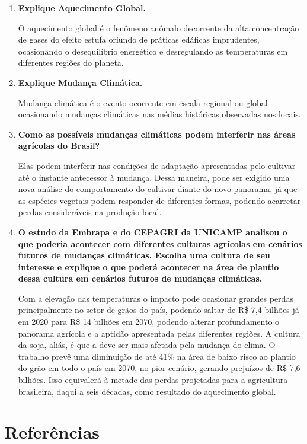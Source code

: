 \documentclass[a4paper, 12pt]{article}
\begin{document}
\begin{enumerate}
		\item\textbf{Explique Aquecimento Global.}
		
		O aquecimento global é o fenômeno anômalo decorrente da alta concentração de gases do efeito estufa oriundo de práticas edáficas imprudentes, ocasionando o desequilíbrio energético e desregulando as temperaturas em diferentes regiões do planeta.
		
		\item\textbf{Explique Mudança Climática.}
		
		Mudança climática é o evento ocorrente em escala regional ou global ocasionando mudanças climáticas nas médias históricas observadas nos locais.
		
		\item\textbf{Como as possíveis mudanças climáticas podem interferir nas áreas agrícolas do Brasil?}
		
		Elas podem interferir nas condições de adaptação apresentadas pelo cultivar até o instante antecessor à mudança. Dessa maneira, pode ser exigido uma nova análise do comportamento do cultivar diante do novo panorama, já que as espécies vegetais podem responder de diferentes formas, podendo acarretar perdas consideráveis na produção local.
		
		\item\textbf{O estudo da Embrapa e do CEPAGRI da UNICAMP analisou o que poderia acontecer com diferentes culturas agrícolas em cenários futuros de mudanças climáticas. Escolha uma cultura de seu interesse e explique o que poderá acontecer na área de plantio dessa cultura em cenários futuros de mudanças climáticas.}
		
		Com a elevação das temperaturas o impacto pode ocasionar grandes perdas principalmente no setor de grãos do país, podendo saltar de R\$ 7,4 bilhões já em 2020  para R\$ 14 bilhões em 2070, podendo alterar profundamento o panorama agrícola e a aptidão apresentada pelas diferentes regiões.
		A cultura da soja, aliás, é que a deve ser mais afetada pela mudança do clima. O trabalho prevê uma diminuição de até 41\% na área de baixo risco ao plantio do grão em todo o país em 2070, no pior cenário, gerando prejuízos de R\$ 7,6 bilhões. Isso equivalerá à metade das perdas projetadas para a agricultura brasileira, daqui a seis décadas, como resultado do aquecimento global.
		
	\end{enumerate}

	\section{Referências}
	
\end{document}
